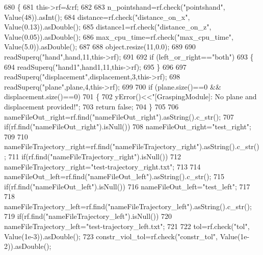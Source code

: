 \begin{DoxyCode}
680 \{
681     this->rf=&rf;
682 
683     n_pointshand=rf.check(\textcolor{stringliteral}{"pointshand"}, Value(48)).asInt();
684     distance=rf.check(\textcolor{stringliteral}{"distance\_on\_x"}, Value(0.13)).asDouble();
685     distance1=rf.check(\textcolor{stringliteral}{"distance\_on\_z"}, Value(0.05)).asDouble();
686     max_cpu_time=rf.check(\textcolor{stringliteral}{"max\_cpu\_time"}, Value(5.0)).asDouble();
687 
688     \textcolor{keywordtype}{object}.resize(11,0.0);
689 
690     readSuperq(\textcolor{stringliteral}{"hand"},hand,11,this->rf);
691 
692     \textcolor{keywordflow}{if} (left_or_right==\textcolor{stringliteral}{"both"})
693     \{
694         readSuperq(\textcolor{stringliteral}{"hand1"},hand1,11,this->rf);
695     \}
696 
697     readSuperq(\textcolor{stringliteral}{"displacement"},displacement,3,this->rf);
698     readSuperq(\textcolor{stringliteral}{"plane"},plane,4,this->rf);
699 
700     \textcolor{keywordflow}{if} (plane.size()==0 && displacement.size()==0)
701     \{
702         yError()<<\textcolor{stringliteral}{"[GraspingModule]: No plane and displacement provided!"};
703         \textcolor{keywordflow}{return} \textcolor{keyword}{false};
704     \}
705 
706     nameFileOut_right=rf.find(\textcolor{stringliteral}{"nameFileOut\_right"}).asString().c\_str();
707     \textcolor{keywordflow}{if}(rf.find(\textcolor{stringliteral}{"nameFileOut\_right"}).isNull())
708        nameFileOut_right=\textcolor{stringliteral}{"test\_right"};
709 
710     nameFileTrajectory_right=rf.find(\textcolor{stringliteral}{"nameFileTrajectory\_right"}).asString().c\_str();
711     \textcolor{keywordflow}{if}(rf.find(\textcolor{stringliteral}{"nameFileTrajectory\_right"}).isNull())
712        nameFileTrajectory_right=\textcolor{stringliteral}{"test-trajectory\_right.txt"};
713 
714     nameFileOut_left=rf.find(\textcolor{stringliteral}{"nameFileOut\_left"}).asString().c\_str();
715     \textcolor{keywordflow}{if}(rf.find(\textcolor{stringliteral}{"nameFileOut\_left"}).isNull())
716        nameFileOut_left=\textcolor{stringliteral}{"test\_left"};
717 
718     nameFileTrajectory_left=rf.find(\textcolor{stringliteral}{"nameFileTrajectory\_left"}).asString().c\_str();
719     \textcolor{keywordflow}{if}(rf.find(\textcolor{stringliteral}{"nameFileTrajectory\_left"}).isNull())
720        nameFileTrajectory_left=\textcolor{stringliteral}{"test-trajectory\_left.txt"};
721 
722     tol=rf.check(\textcolor{stringliteral}{"tol"}, Value(1e-3)).asDouble();
723     constr_viol_tol=rf.check(\textcolor{stringliteral}{"constr\_tol"}, Value(1e-2)).asDouble();

\end{DoxyCode}
